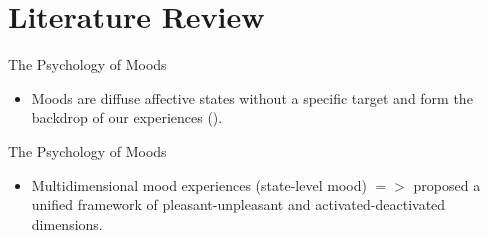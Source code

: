 \documentclass[pdf]{beamer}
\begin{document}
\section{Literature Review}
\begin{frame}{The Psychology of Moods}
\begin{itemize} 
    \item<1-> Moods are diffuse affective states without a specific target and form the backdrop of our experiences (\cite{lischetzke_mood_2022}).
\end{itemize}
\end{frame}

\begin{frame}{The Psychology of Moods}
\begin{itemize}
    \item<1-> Multidimensional mood experiences (state-level mood) $=>$ \textcite{yik_structure_1999} proposed a unified framework of \alert{pleasant-unpleasant} and \alert{activated-deactivated} dimensions. 
\end{itemize}
\end{frame}
\end{document}
